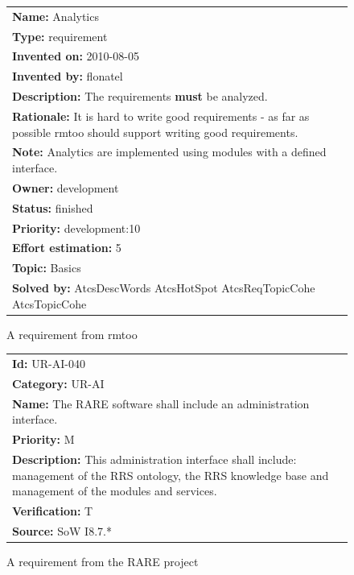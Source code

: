 \documentclass{llncs}
\begin{document}
\begin{figure}[H]
	\centering
	\begin{tabular}{ | p{\linewidth} | }
	\hline
	\textbf{Name:} Analytics \\
	\textbf{Type:} requirement \\
	\textbf{Invented on:} 2010-08-05 \\
	\textbf{Invented by:} flonatel \\
	\textbf{Description:} The requirements \textbf{must} be analyzed. \\
	\textbf{Rationale:} It is hard to write good requirements - as far as possible rmtoo should support writing good requirements. \\
	\textbf{Note:} Analytics are implemented using modules with a defined interface. \\
	\textbf{Owner:} development \\
	\textbf{Status:} finished \\
	\textbf{Priority:} development:10 \\
	\textbf{Effort estimation:} 5 \\
	\textbf{Topic:} Basics \\
	\textbf{Solved by:} AtcsDescWords AtcsHotSpot AtcsReqTopicCohe AtcsTopicCohe \\
	\hline
	\end{tabular}
	\caption{A requirement from rmtoo}
	\label{table:rmtoo_req}
\end{figure}

\begin{figure}[H]
	\centering
	\begin{tabular}{ | p{\linewidth} | }
	\hline
	\textbf{Id:} UR-AI-040 \\
	\textbf{Category:} UR-AI \\
	\textbf{Name:} The RARE software shall include an administration interface. \\
	\textbf{Priority:} M \\
	\textbf{Description:} This administration interface shall include: management of the RRS ontology, the RRS knowledge base and management of the modules and services. \\
	\textbf{Verification:} T \\
	\textbf{Source:} SoW I8.7.* \\
	\hline
	\end{tabular}
	\caption{A requirement from the RARE project}
	\label{table:rare_req}
\end{figure}
\end{document}
